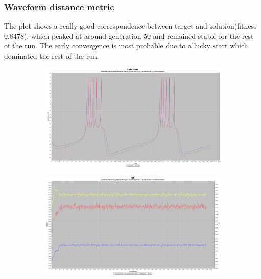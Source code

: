 \documentclass[10pt]{article}
\begin{document}
		\subsubsection{Waveform distance metric}
			The plot shows a really good correspondence between target and solution(fitness $0.8478$), which peaked at around generation $50$ and remained stable for the rest of the run. The early convergence is most probable due to a lucky start which dominated the rest of the run.
			\begin{figure}[H]
				\centering
					\begin{subfigure}{.5\textwidth}
						\centering
						\includegraphics[width=\linewidth]{./../images/izzy3/wave/plot.png}

						\label{fig:sub9a}
					\end{subfigure}%
					\begin{subfigure}{.5\textwidth}
						\centering
						\includegraphics[width=\linewidth]{./../images/izzy3/wave/prog.png}
						
						\label{fig:sub9b}
					\end{subfigure}
					
					\label{fig:plot9}
			\end{figure}
\end{document}
